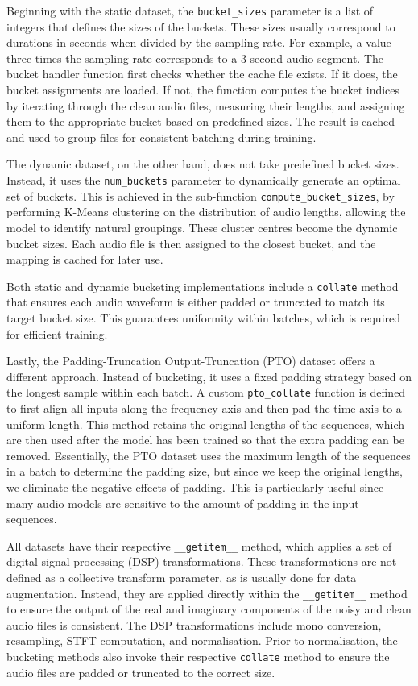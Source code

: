 Beginning with the static dataset, the \texttt{bucket\_sizes} parameter is a list of integers that defines the sizes of the buckets. These sizes usually correspond to durations in seconds when divided by the sampling rate. For example, a value three times the sampling rate corresponds to a 3-second audio segment. The bucket handler function first checks whether the cache file exists. If it does, the bucket assignments are loaded. If not, the function computes the bucket indices by iterating through the clean audio files, measuring their lengths, and assigning them to the appropriate bucket based on predefined sizes. The result is cached and used to group files for consistent batching during training.

The dynamic dataset, on the other hand, does not take predefined bucket sizes. Instead, it uses the \texttt{num\_buckets} parameter to dynamically generate an optimal set of buckets. This is achieved in the sub-function \texttt{compute\_bucket\_sizes}, by performing K-Means clustering on the distribution of audio lengths, allowing the model to identify natural groupings. These cluster centres become the dynamic bucket sizes. Each audio file is then assigned to the closest bucket, and the mapping is cached for later use.

Both static and dynamic bucketing implementations include a \texttt{collate} method that ensures each audio waveform is either padded or truncated to match its target bucket size. This guarantees uniformity within batches, which is required for efficient training.

Lastly, the Padding-Truncation Output-Truncation (PTO) dataset offers a different approach. Instead of bucketing, it uses a fixed padding strategy based on the longest sample within each batch. A custom \texttt{pto\_collate} function is defined to first align all inputs along the frequency axis and then pad the time axis to a uniform length. This method retains the original lengths of the sequences, which are then used after the model has been trained so that the extra padding can be removed. Essentially, the PTO dataset uses the maximum length of the sequences in a batch to determine the padding size, but since we keep the original lengths, we eliminate the negative effects of padding. This is particularly useful since many audio models are sensitive to the amount of padding in the input sequences.

All datasets have their respective \texttt{\_\_getitem\_\_} method, which applies a set of digital signal processing (DSP) transformations. These transformations are not defined as a collective transform parameter, as is usually done for data augmentation. Instead, they are applied directly within the \texttt{\_\_getitem\_\_} method to ensure the output of the real and imaginary components of the noisy and clean audio files is consistent. The DSP transformations include mono conversion, resampling, STFT computation, and normalisation. Prior to normalisation, the bucketing methods also invoke their respective \texttt{collate} method to ensure the audio files are padded or truncated to the correct size.

